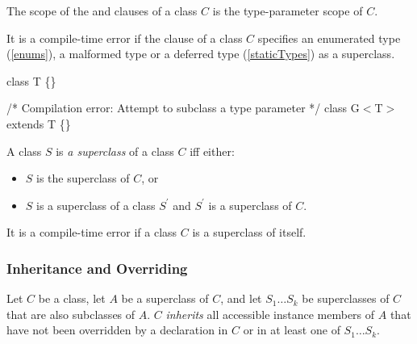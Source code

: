 \documentclass{article}
\begin{document}

\LMHash{}
The scope of the \EXTENDS{} and \WITH{} clauses of a class $C$ is the type-parameter scope of $C$.

\LMHash{}
It is a compile-time error if  the \EXTENDS{} clause of a class $C$ specifies an enumerated type (\ref{enums}), a malformed  type or a deferred type (\ref{staticTypes}) as a superclass.


\begin{dartCode}
class T \{\}

/* Compilation error: Attempt to subclass a type parameter */
class G$<$T$>$ extends T \{\}

\end{dartCode}


\LMHash{}
A class $S$ is {\em a superclass} of a class $C$ iff either:
\begin{itemize}
\item $S$ is the superclass of $C$, or
\item $S$ is a superclass of a class $S^{\prime}$ and $S^{\prime}$ is a superclass of $C$.
\end{itemize}

\LMHash{}
It is a compile-time error if a class $C$ is a superclass of itself.




 \subsubsection{Inheritance and Overriding}



\LMHash{}
Let $C$ be a class,  let $A$ be a superclass of $C$, and let  $S_1 \ldots S_k$ be superclasses of $C$ that are also subclasses of $A$. $C$ {\em inherits} all accessible instance  members of  $A$ that have not been overridden by a declaration in $C$ or in at least one of $S_1 \ldots S_k$.
\end{document}
